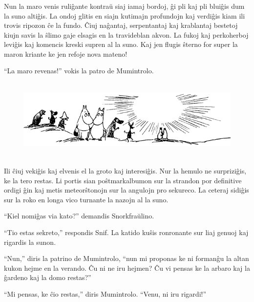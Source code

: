 Nun la maro venis ruliĝante kontraŭ siaj iamaj bordoj, ĝi pli kaj pli bluiĝis dum la suno altiĝis. La ondoj glitis en siajn kutimajn profundojn kaj verdiĝis kiam ili trovis ripozon ĉe la fundo. Ĉiuj naĝantaj, serpentantaj kaj krablantaj bestetoj kiujn savis la ŝlimo gaje elsagis en la travideblan akvon. La fukoj kaj perkoherboj leviĝis kaj komencis kreski supren al la suno. Kaj jen flugis ŝterno for super la maron kriante ke jen refoje nova mateno!

``La maro revenas!'' vokis la patro de Mumintrolo.

\begin{figure}[htbp]
\centering
\includegraphics[width=450pt,height=115pt]{10-2.png}
\caption{}
\label{10-2}
\end{figure}

Ili ĉiuj vekiĝis kaj elvenis el la groto kaj interesiĝis. Nur la hemulo ne surpriziĝis, ke la tero restas. Li portis sian poŝtmarkalbumon sur la strandon por definitive ordigi ĝin kaj metis meteorŝtonojn sur la angulojn pro sekureco. La ceteraj sidiĝis sur la roko en longa vico turnante la nazojn al la suno.

``Kiel nomiĝas via kato?'' demandis Snorkfraŭlino.

``Tio estas sekreto,'' respondis Snif. La katido kuŝis ronronante sur liaj genuoj kaj rigardis la sunon.

``Nun,'' diris la patrino de Mumintrolo, ``nun mi proponas ke ni formanĝu la altan kukon hejme en la verando. Ĉu ni ne iru hejmen? Ĉu vi pensas ke la arbaro kaj la ĝardeno kaj la domo restas?''

``Mi pensas, ke ĉio restas,'' diris Mumintrolo. ``Venu, ni iru rigardi!''



